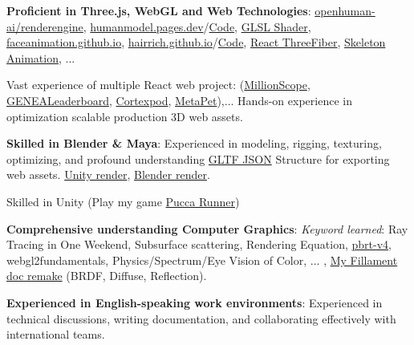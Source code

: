 	\begin{onecolentry}
		\begin{highlightsforbulletentries}
			
			
			\item \textbf{Proficient in Three.js, WebGL and Web Technologies}: \href{https://github.com/openhuman-ai/renderengine}{openhuman-ai/renderengine}, \href{https://humanmodel.pages.dev}{humanmodel.pages.dev}/\href{https://github.com/openhuman-ai/humanmodel}{Code}, \href{https://github.com/openhuman-ai/renderengine/blob/main/test/vertex_full.glsl}{GLSL Shader}, \href{https://github.com/FaceAnimation/faceanimation.github.io/tree/main/src}{faceanimation.github.io}, \href{https://hairrich.github.io}{hairrich.github.io}/\href{https://github.com/hairrich/hairrich.github.io}{Code}, \href{https://hmthanh.github.io/CrossSphere}{React ThreeFiber}, \href{https://jumming.vercel.app/}{Skeleton Animation}, ...
			
			Vast experience of multiple React web project: (\href{https://millionscope.com}{MillionScope}, \href{https://github.com/genealeaderboard/genealeaderboard.github.io}{GENEALeaderboard}, \href{https://cortexpod.com}{Cortexpod}, \href{https://metapet.vercel.app}{MetaPet}),...
			Hands-on experience in optimization scalable production 3D web assets. 
			
			\item \textbf{Skilled in Blender \& Maya}: Experienced in modeling, rigging, texturing, optimizing, and profound understanding \href{https://github.com/hmthanh/glTF-Sample-Viewer}{GLTF JSON} Structure for exporting web assets. \href{https://www.youtube.com/@openhuman_ai}{Unity render}, \href{https://www.instagram.com/p/DKMV3xwJcQm}{Blender render}. 
			
			Skilled in Unity (Play my game \href{https://hmthanh.github.io/pucca_runner/}{Pucca Runner})
			
			\item \textbf{Comprehensive understanding Computer Graphics}: \textit{Keyword learned}: Ray Tracing in One Weekend, Subsurface scattering, Rendering Equation, \href{https://github.com/hmthanh/pbrt-v4}{pbrt-v4}, webgl2fundamentals, Physics/Spectrum/Eye Vision of Color, ... ,  \href{https://mattergen.github.io}{My Fillament doc remake} (BRDF, Diffuse, Reflection).
			
			\item \textbf{Experienced in English-speaking work environments}: Experienced in technical discussions, writing documentation, and collaborating effectively with international teams.
			
		\end{highlightsforbulletentries}
	\end{onecolentry}
	
	
	
	
	